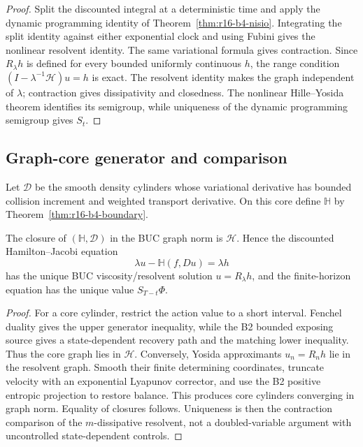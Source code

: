 \begin{proof}
Split the discounted integral at a deterministic time and apply the dynamic
programming identity of Theorem~\ref{thm:r16-b4-nisio}.  Integrating the split
identity against either exponential clock and using Fubini gives the nonlinear
resolvent identity.  The same variational formula gives contraction.  Since
\(R_\lambda h\) is defined for every bounded uniformly continuous \(h\), the
range condition \((I-\lambda^{-1}\mathscr H)u=h\) is exact.  The resolvent
identity makes the graph independent of \(\lambda\); contraction gives
dissipativity and closedness.  The nonlinear Hille--Yosida theorem identifies
its semigroup, while uniqueness of the dynamic programming semigroup gives
\(S_t\).
\end{proof}

\subsection{Graph-core generator and comparison}

Let \(\mathscr D\) be the smooth density cylinders whose variational derivative
has bounded collision increment and weighted transport derivative.  On this
core define \(\mathbb H\) by
Theorem~\ref{thm:r16-b4-boundary}.

\begin{theorem}
\label{thm:r16-b4-comparison}
The closure of \((\mathbb H,\mathscr D)\) in the BUC graph norm is
\(\mathscr H\).  Hence the discounted Hamilton--Jacobi equation
\[
 \lambda u-\mathbb H(f,Du)=\lambda h
\]
has the unique BUC viscosity/resolvent solution \(u=R_\lambda h\), and the
finite-horizon equation has the unique value \(S_{T-t}\Phi\).
\end{theorem}

\begin{proof}
For a core cylinder, restrict the action value to a short interval.  Fenchel
duality gives the upper generator inequality, while the B2 bounded exposing
source gives a state-dependent recovery path and the matching lower inequality.
Thus the core graph lies in \(\mathscr H\).  Conversely, Yosida approximants
\(u_n=R_n h\) lie in the resolvent graph.  Smooth their finite determining
coordinates, truncate velocity with an exponential Lyapunov corrector, and
use the B2 positive entropic projection to restore balance.  This produces
core cylinders converging in graph norm.  Equality of closures follows.
Uniqueness is then the contraction comparison of the \(m\)-dissipative
resolvent, not a doubled-variable argument with uncontrolled state-dependent
controls.
\end{proof}

